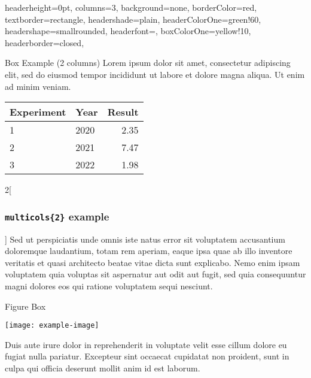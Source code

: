 \documentclass[portrait,fontscale=1,margin=0.2cm,paperwidth=14truecm, paperheight=10truecm,debug]{baposter}
\begin{document}
\begin{poster}{
  headerheight=0pt,
  columns=3,
  background=none,
  borderColor=red,
  textborder=rectangle,
  headershade=plain,
  headerColorOne=green!60,
  headershape=smallrounded,
  headerfont={},
  boxColorOne=yellow!10,
  headerborder=closed,
}{}{}{}{}

\begin{posterbox}[column=0,span=2,height=bottom]{Box Example (2 columns)}
Lorem ipsum dolor sit amet, consectetur adipiscing elit, sed do eiusmod tempor incididunt ut labore et dolore magna aliqua. Ut enim ad minim veniam.
\begin{center}
  \begin{tabular}{llr}
    \hline
    Experiment & Year & Result \\
    \hline
    1          & 2020 & 2.35 \\
    2          & 2021 & 7.47 \\
    3          & 2022 & 1.98 \\
    \hline
  \end{tabular}
\end{center}
\begin{multicols}{2}[\subsubsection*{\texttt{multicols\{2\}} example}]
  Sed ut perspiciatis unde omnis iste natus error sit voluptatem accusantium doloremque laudantium, totam rem aperiam, eaque ipsa quae ab illo inventore veritatis et quasi architecto beatae vitae dicta sunt explicabo. Nemo enim ipsam voluptatem quia voluptas sit aspernatur aut odit aut fugit, sed quia consequuntur magni dolores eos qui ratione voluptatem sequi nesciunt. 
\end{multicols}
\end{posterbox}

\begin{posterbox}[column=2,height=bottom]{Figure Box}
  \begin{center}
    \texttt{[image: example-image]}
  \end{center}
Duis aute irure dolor in reprehenderit in voluptate velit esse cillum dolore eu fugiat nulla pariatur. Excepteur sint occaecat cupidatat non proident, sunt in culpa qui officia deserunt mollit anim id est laborum.
\end{posterbox}

\end{poster}
\end{document}
